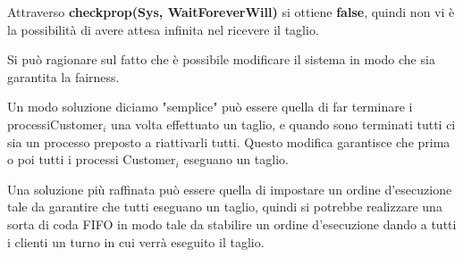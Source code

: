 Attraverso \textbf{checkprop(Sys, WaitForeverWill)} si ottiene \textbf{false}, quindi non vi è la possibilità di avere attesa infinita nel ricevere il taglio.

Si può ragionare sul fatto che è possibile modificare il sistema in modo che sia garantita la fairness.

Un modo soluzione diciamo "semplice" può essere quella di far terminare i processi\textsf{Customer$_{i}$} una volta effettuato un taglio, e quando sono terminati tutti ci sia un processo preposto a riattivarli tutti. Questo modifica garantisce che prima o poi tutti i processi \textsf{Customer$_{i}$} eseguano un taglio.

Una soluzione più raffinata può essere quella di impostare un ordine d'esecuzione tale da garantire che tutti eseguano un taglio, quindi si potrebbe realizzare una sorta di coda FIFO in modo tale da stabilire un ordine d'esecuzione dando a tutti i clienti un turno in cui verrà eseguito il taglio.



